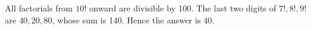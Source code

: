 All factorials from $10!$ onward are divisible by 100. The last two digits of $7!,8!,9!$ are $40,20,80$, whose sum is 140. Hence the answer is $\boxed{40}$.
